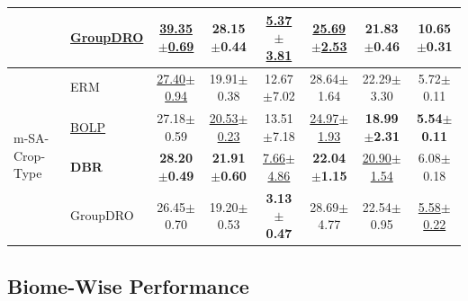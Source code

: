 \documentclass[10pt,twocolumn,letterpaper]{article}
\begin{document}
\begin{table}[t]
{\begin{tabular}{llcccccc}
 & \underline{GroupDRO} & \underline{39.35$\pm$0.69} & 28.15$\pm$0.44 & \underline{5.37$\pm$3.81} & \underline{25.69$\pm$2.53} & \textbf{21.83$\pm$0.46} & 10.65$\pm$0.31 \\
\midrule
\multirow{4}{*}{m-SA-Crop-Type} 
 & ERM & \underline{27.40$\pm$0.94} & 19.91$\pm$0.38 & 12.67$\pm$7.02 & 28.64$\pm$1.64 & 22.29$\pm$3.30 & 5.72$\pm$0.11 \\
 & \underline{BOLP} & 27.18$\pm$0.59 & \underline{20.53$\pm$0.23} & 13.51$\pm$7.18 & \underline{24.97$\pm$1.93} & \textbf{18.99$\pm$2.31} & \textbf{5.54$\pm$0.11} \\
 & \textbf{DBR} & \textbf{28.20$\pm$0.49} & \textbf{21.91$\pm$0.60} & \underline{7.66$\pm$4.86} & \textbf{22.04$\pm$1.15} & \underline{20.90$\pm$1.54} & 6.08$\pm$0.18 \\
 & GroupDRO & 26.45$\pm$0.70 & 19.20$\pm$0.53 & \textbf{3.13$\pm$0.47} & 28.69$\pm$4.77 & 22.54$\pm$0.95 & \underline{5.58$\pm$0.22} \\
\bottomrule
\end{tabular}
}

\end{table}




\subsection{Biome-Wise Performance}
\end{document}
